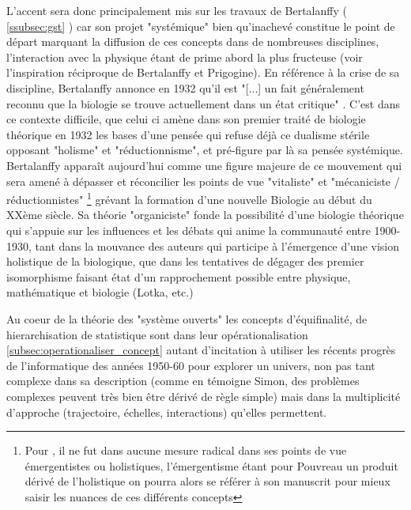 L'accent sera donc principalement mis sur les travaux de Bertalanffy ( \ref{ssubsec:gst} ) car son projet "systémique" bien qu'inachevé constitue le point de départ marquant la diffusion de ces concepts dans de nombreuses disciplines, l'interaction avec la physique étant de prime abord la plus fructeuse (voir l'inspiration réciproque de Bertalanffy et Prigogine). En référence à la crise de sa discipline, Bertalanffy annonce en 1932 qu'il est  "[...] un fait généralement reconnu que la biologie se trouve actuellement dans un état critique" \autocite[21]{Pouvreau2013}. C'est dans ce contexte difficile, que celui ci amène dans son premier traité de biologie théorique en 1932 les bases d'une pensée qui refuse déjà ce dualisme stérile opposant "holisme" et "réductionnisme", et pré-figure par là sa pensée systémique. Bertalanffy apparaît aujourd'hui comme une figure majeure de ce mouvement qui sera amené à dépasser et réconcilier les points de vue "vitaliste" et "mécaniciste / réductionnistes" \footnote{Pour \autocite[47-54]{Pouvreau2013}, il ne fut dans aucune mesure radical dans ses points de vue émergentistes ou holistiques, l'émergentisme étant pour Pouvreau un produit dérivé de l'holistique on pourra alors se référer à son manuscrit pour mieux saisir les nuances de ces différents concepts} grévant la formation d'une nouvelle Biologie au début du XXème siècle\autocite[20]{Pouvreau2013}. Sa théorie "organiciste" fonde la possibilité d'une biologie théorique qui s'appuie sur les influences et les débats qui anime la communauté entre 1900-1930, tant dans la mouvance des auteurs qui participe à l'émergence d'une vision holistique de la biologique, que dans les tentatives de dégager des premier isomorphisme faisant état d'un rapprochement possible entre physique, mathématique et biologie (Lotka, etc.) 

Au coeur de la théorie des "système ouverts" les concepts d'équifinalité, de hierarchisation de statistique sont dans leur opérationalisation \ref{subsec:operationaliser_concept} autant d'incitation à utiliser les récents progrès de l'informatique des années 1950-60 pour explorer un univers, non pas tant complexe dans sa description (comme en témoigne Simon, des problèmes complexes peuvent très bien être dérivé de règle simple) mais dans la multiplicité d'approche (trajectoire, échelles, interactions) qu'elles permettent.

